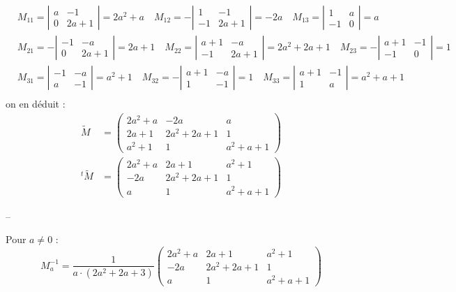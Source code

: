 {{$$\begin{aligned}
	& M_{11}=\left|\begin{array}{cc}
		a & -1 \\
		0 & 2 a+1
	\end{array}\right|=2 a^2+a \quad M_{12}=-\left|\begin{array}{cc}
		1 & -1 \\
		-1 & 2 a+1
	\end{array}\right|=-2 a \quad M_{13}=\left|\begin{array}{cc}
		1 & a \\
		-1 & 0
	\end{array}\right|=a \\
	& M_{21}=-\left|\begin{array}{cc}
		-1 & -a \\
		0 & 2 a+1
	\end{array}\right|=2 a+1 \quad M_{22}=\left|\begin{array}{cc}
		a+1 & -a \\
		-1 & 2 a+1
	\end{array}\right|=2 a^2+2 a+1 \quad M_{23}=-\left|\begin{array}{cc}
		a+1 & -1 \\
		-1 & 0
	\end{array}\right|=1 \\
	& M_{31}=\left|\begin{array}{cc}
		-1 & -a \\
		a & -1
	\end{array}\right|=a^2+1 \quad M_{32}=-\left|\begin{array}{cc}
		a+1 & -a \\
		1 & -1
	\end{array}\right|=1 \quad M_{33}=\left|\begin{array}{cc}
		a+1 & -1 \\
		1 & a
	\end{array}\right|=a^2+a+1 \\
	&
\end{aligned}
$$
on en déduit :
$$
\begin{aligned}
	\tilde{M} & =\left(\begin{array}{ccc}
		2 a^2+a & -2 a & a \\
		2 a+1 & 2 a^2+2 a+1 & 1 \\
		a^2+1 & 1 & a^2+a+1
	\end{array}\right) \\
	{ }^t \tilde{M} & =\left(\begin{array}{ccc}
		2 a^2+a & 2 a+1 & a^2+1 \\
		-2 a & 2 a^2+2 a+1 & 1 \\
		a & 1 & a^2+a+1
	\end{array}\right)
\end{aligned}
$$

--

Pour $a \neq 0$ :
$$
M_a^{-1}=\frac{1}{a \cdot\left(2 a^2+2 a+3\right)}\left(\begin{array}{ccc}
	2 a^2+a & 2 a+1 & a^2+1 \\
	-2 a & 2 a^2+2 a+1 & 1 \\
	a & 1 & a^2+a+1
\end{array}\right)
$$ }}
